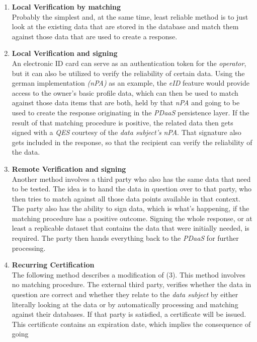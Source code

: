 \documentclass[12pt,english,a4paper,titlepage,cleardoublepage=empty,dottedtoc]{report}
\begin{document}
\begin{enumerate}
\def\labelenumi{(\arabic{enumi})}
\item
  \textbf{Local Verification by matching}\\
  Probably the simplest and, at the same time, least reliable method is
  to just look at the existing data that are stored in the database and
  match them against those data that are used to create a response.
\item
  \textbf{Local Verification and signing}\\
  An electronic ID card can serve as an authentication token for the
  \emph{operator}, but it can also be utilized to verify the reliability
  of certain data. Using the german implementation \emph{(nPA)} as an
  example, the \emph{eID} feature would provide access to the owner's
  basic profile data, which can then be used to match against those data
  items that are both, held by that \emph{nPA} and going to be used to
  create the response originating in the \emph{PDaaS} persistence layer.
  If the result of that matching procedure is positive, the related data
  then gets signed with a \emph{QES} courtesy of the \emph{data
  subject's} \emph{nPA}. That signature also gets included in the
  response, so that the recipient can verify the reliability of the
  data.
\item
  \textbf{Remote Verification and signing}\\
  Another method involves a third party who also has the same data that
  need to be tested. The idea is to hand the data in question over to
  that party, who then tries to match against all those data points
  available in that context. The party also has the ability to sign
  data, which is what's happening, if the matching procedure has a
  positive outcome. Signing the whole response, or at least a replicable
  dataset that contains the data that were initially needed, is
  required. The party then hands everything back to the \emph{PDaaS} for
  further processing.
\item
  \textbf{Recurring Certification}\\
  The following method describes a modification of (3). This method
  involves no matching procedure. The external third party, verifies
  whether the data in question are correct and whether they relate to
  the \emph{data subject} by either literally looking at the data or by
  automatically processing and matching against their databases. If that
  party is satisfied, a certificate will be issued. This certificate
  contains an expiration date, which implies the consequence of going

\end{enumerate}
\end{document}
